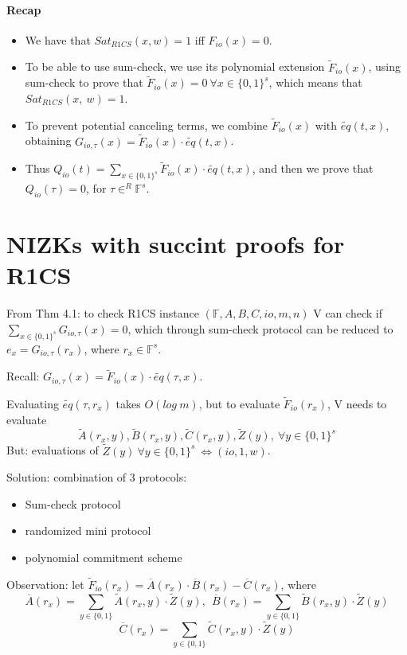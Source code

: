 \documentclass{article}
\theoremstyle{definition}
\begin{document}
\paragraph{Recap}
\begin{itemize}
	\item[] We have that $Sat_{R1CS}(x,w)=1$ iff $F_{io}(x)=0$.
	\item[] To be able to use sum-check, we use its polynomial extension $\widetilde{F}_{io}(x)$, using sum-check to prove that $\widetilde{F}_{io}(x) =0 ~\forall x \in \{0, 1\}^s$, which means that $Sat_{R1CS}(x,~w)=1$.
	\item[] To prevent potential canceling terms, we combine $\widetilde{F}_{io}(x)$ with $\widetilde{eq}(t, x)$, obtaining $G_{io, \tau}(x)= \widetilde{F}_{io}(x) \cdot \widetilde{eq}(t, x)$.
	\item[] Thus $Q_{io}(t)= \sum_{x \in \{0,1\}^s} \widetilde{F}_{io}(x) \cdot \widetilde{eq}(t, x)$, and then we prove that $Q_{io}(\tau)=0$, for $\tau \in^R \mathbb{F}^s$.
\end{itemize}

\section{NIZKs with succint proofs for R1CS}

From Thm 4.1: to check R1CS instance $(\mathbb{F}, A, B, C, io, m, n)$ V can check if
$\sum_{x \in \{0,1\}^s} G_{io, \tau} (x) = 0$, which through sum-check protocol can be reduced to $e_x = G_{io, \tau} (r_x)$, where $r_x \in \mathbb{F}^s$.

Recall: $G_{io, \tau}(x) = \widetilde{F}_{io}(x) \cdot \widetilde{eq}(\tau, x)$.

Evaluating $\widetilde{eq}(\tau, r_x)$ takes $O(log~m)$, but to evaluate $\widetilde{F}_{io}(r_x)$, V needs to evaluate
$$\widetilde{A}(r_x, y), \widetilde{B}(r_x, y), \widetilde{C}(r_x, y), \widetilde{Z}(y),~ \forall y \in \{0,1\}^s$$
But: evaluations of $\widetilde{Z}(y) ~\forall y \in \{0,1\}^s ~\Longleftrightarrow (io, 1, w)$.

Solution: combination of 3 protocols:
\begin{itemize}
	\item Sum-check protocol
	\item randomized mini protocol
	\item polynomial commitment scheme
\end{itemize}

Observation: let $\widetilde{F}_{io}(r_x) = \overline{A}(r_x) \cdot \overline{B}(r_x) - \overline{C}(r_x)$, where
$$\overline{A}(r_x) = \sum_{y \in \{0,1\}} \widetilde{A}(r_x, y) \cdot \widetilde{Z}(y),~~\overline{B}(r_x) = \sum_{y \in \{0,1\}} \widetilde{B}(r_x, y) \cdot \widetilde{Z}(y)$$
$$\overline{C}(r_x) = \sum_{y \in \{0,1\}} \widetilde{C}(r_x, y) \cdot \widetilde{Z}(y)$$
\end{document}
